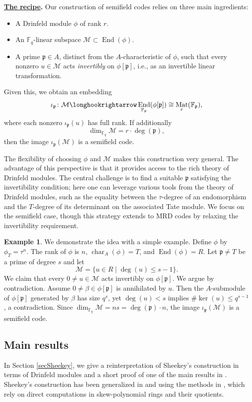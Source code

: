\documentclass[12pt]{amsart}
\theoremstyle{definition}
\newtheorem{example}[thm]{Example}
\theoremstyle{remark}
\numberwithin{equation}{section}
\numberwithin{thm}{section}
\DeclareMathOperator{\End}{End}
\DeclareMathOperator{\chr}{char}
\DeclareMathOperator{\Mat}{Mat}
\newcommand{\fp}{\mathfrak{p}}
\newcommand{\cM}{\mathcal{M}}
\newcommand{\F}{\mathbb{F}}
\begin{document}
\vspace{0.1in}
\noindent 
\textbf{\underline{The recipe}.} Our construction of semifield codes relies on three main ingredients:
\begin{itemize}
\item A Drinfeld module $\phi$ of rank $r$.
\item An $\F_q$-linear subspace $\cM \subset \End(\phi)$.
\item A prime $\fp \in A$, distinct from the $A$-characteristic of $\phi$, such that every nonzero $u \in \cM$ acts \textit{invertibly} on $\phi[\fp]$, i.e., as an invertible linear transformation. 
\end{itemize}
Given this, we obtain an embedding
\[
\iota_\fp \colon \cM \longhookrightarrow \End_{\F_\fp}(\phi[\fp]) \cong \Mat_r(\F_\fp), 
\]
where each nonzero $\iota_\fp(u)$ has full rank. If additionally 
\[\dim_{\F_q} \cM = r \cdot \deg(\fp),\] then the image $\iota_\fp(\cM)$ is a semifield code.

\vspace{0.1in}

The flexibility of choosing $\phi$ and $\cM$ makes this construction very general. 
The advantage of this perspective is that it provides access to the rich theory of 
Drinfeld modules. The central challenge is to find a suitable $\fp$ satisfying the invertibility condition; here one can leverage various tools from the theory of Drinfeld modules, such as the equality between the $\tau$-degree of an endomorphism and the $T$-degree of its determinant on the associated Tate module. We focus on the semifield case, though this strategy extends to MRD codes by relaxing the invertibility requirement.

\begin{example}\label{BasicExample}
We demonstrate the idea with a simple example. 
Define $\phi$ by $\phi_T=\tau^n$. The rank of $\phi$ is $n$, $\chr_A(\phi)=T$, and $\End(\phi)=R$. 
Let $\fp\neq T$ be a prime of degree $s$ and let 
$$
\cM=\{u\in R\mid \deg(u)\leq s-1\}. 
$$
We claim that every $0\neq u\in \cM$ acts invertibly on $\phi[\fp]$. We argue by contradiction. Assume $0\neq \beta\in \phi[\fp]$ 
is annihilated by $u$. Then the $A$-submodule of $\phi[\fp]$ generated by $\beta$ has size $q^s$, yet $\deg(u)<s$ implies $\#\ker(u)\leq q^{s-1}$, a contradiction. 
Since $\dim_{\F_q}\cM=ns=\deg(\fp)\cdot n$, the image $\iota_\fp(\cM)$ is a semifield code.
\end{example}

\subsection{Main results} 
In Section \ref{secSheekey}, we give a reinterpretation of Sheekey's construction 
\cite{Sheekey} in terms of Drinfeld modules and a short proof 
of one of the main results in \cite{Sheekey}. 
Sheekey's construction has been generalized in \cite{TZ} and \cite{LSS} using the 
methods in \cite{Sheekey}, which rely on direct computations in skew-polynomial rings 
and their quotients. 
\end{document}
